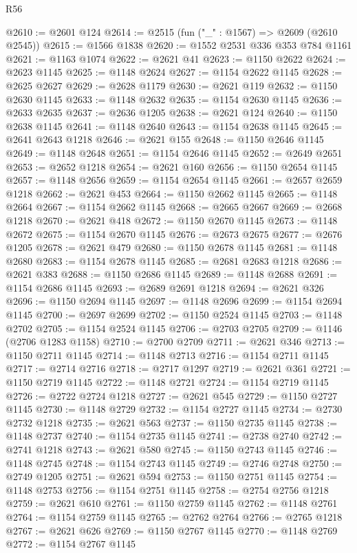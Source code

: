 \begin{lexlean}{R56}
\begin{coremodule}
@2610 := @2601 @124
@2614 := @2515 (fun ("_" : @1567) => @2609 (@2610 @2545))
@2615 := @1566 @1838
@2620 := @1552 @2531 @336 @353 @784 @1161
@2621 := @1163 @1074
@2622 := @2621 @41
@2623 := @1150 @2622
@2624 := @2623 @1145
@2625 := @1148 @2624
@2627 := @1154 @2622 @1145
@2628 := @2625 @2627
@2629 := @2628 @1179
@2630 := @2621 @119
@2632 := @1150 @2630 @1145
@2633 := @1148 @2632
@2635 := @1154 @2630 @1145
@2636 := @2633 @2635
@2637 := @2636 @1205
@2638 := @2621 @124
@2640 := @1150 @2638 @1145
@2641 := @1148 @2640
@2643 := @1154 @2638 @1145
@2645 := @2641 @2643 @1218
@2646 := @2621 @155
@2648 := @1150 @2646 @1145
@2649 := @1148 @2648
@2651 := @1154 @2646 @1145
@2652 := @2649 @2651
@2653 := @2652 @1218
@2654 := @2621 @160
@2656 := @1150 @2654 @1145
@2657 := @1148 @2656
@2659 := @1154 @2654 @1145
@2661 := @2657 @2659 @1218
@2662 := @2621 @453
@2664 := @1150 @2662 @1145
@2665 := @1148 @2664
@2667 := @1154 @2662 @1145
@2668 := @2665 @2667
@2669 := @2668 @1218
@2670 := @2621 @418
@2672 := @1150 @2670 @1145
@2673 := @1148 @2672
@2675 := @1154 @2670 @1145
@2676 := @2673 @2675
@2677 := @2676 @1205
@2678 := @2621 @479
@2680 := @1150 @2678 @1145
@2681 := @1148 @2680
@2683 := @1154 @2678 @1145
@2685 := @2681 @2683 @1218
@2686 := @2621 @383
@2688 := @1150 @2686 @1145
@2689 := @1148 @2688
@2691 := @1154 @2686 @1145
@2693 := @2689 @2691 @1218
@2694 := @2621 @326
@2696 := @1150 @2694 @1145
@2697 := @1148 @2696
@2699 := @1154 @2694 @1145
@2700 := @2697 @2699
@2702 := @1150 @2524 @1145
@2703 := @1148 @2702
@2705 := @1154 @2524 @1145
@2706 := @2703 @2705
@2709 := @1146 (@2706 @1283 @1158)
@2710 := @2700 @2709
@2711 := @2621 @346
@2713 := @1150 @2711 @1145
@2714 := @1148 @2713
@2716 := @1154 @2711 @1145
@2717 := @2714 @2716
@2718 := @2717 @1297
@2719 := @2621 @361
@2721 := @1150 @2719 @1145
@2722 := @1148 @2721
@2724 := @1154 @2719 @1145
@2726 := @2722 @2724 @1218
@2727 := @2621 @545
@2729 := @1150 @2727 @1145
@2730 := @1148 @2729
@2732 := @1154 @2727 @1145
@2734 := @2730 @2732 @1218
@2735 := @2621 @563
@2737 := @1150 @2735 @1145
@2738 := @1148 @2737
@2740 := @1154 @2735 @1145
@2741 := @2738 @2740
@2742 := @2741 @1218
@2743 := @2621 @580
@2745 := @1150 @2743 @1145
@2746 := @1148 @2745
@2748 := @1154 @2743 @1145
@2749 := @2746 @2748
@2750 := @2749 @1205
@2751 := @2621 @594
@2753 := @1150 @2751 @1145
@2754 := @1148 @2753
@2756 := @1154 @2751 @1145
@2758 := @2754 @2756 @1218
@2759 := @2621 @610
@2761 := @1150 @2759 @1145
@2762 := @1148 @2761
@2764 := @1154 @2759 @1145
@2765 := @2762 @2764
@2766 := @2765 @1218
@2767 := @2621 @626
@2769 := @1150 @2767 @1145
@2770 := @1148 @2769
@2772 := @1154 @2767 @1145

\end{coremodule}
\end{lexlean}

